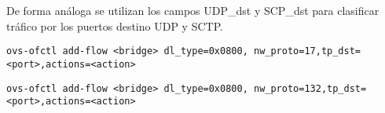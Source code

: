\begin{itemize}
De forma análoga se utilizan los campos UDP\_dst y SCP\_dst para clasificar tr\'afico por los puertos destino UDP y SCTP.

\begin{center}
\texttt{ovs-ofctl add-flow <bridge> dl\_type=0x0800, nw\_proto=17,tp\_dst=<port>,actions=<action>}
\end{center}

\begin{center}
\texttt{ovs-ofctl add-flow <bridge> dl\_type=0x0800, nw\_proto=132,tp\_dst=<port>,actions=<action>}
\end{center}









\end{itemize}

